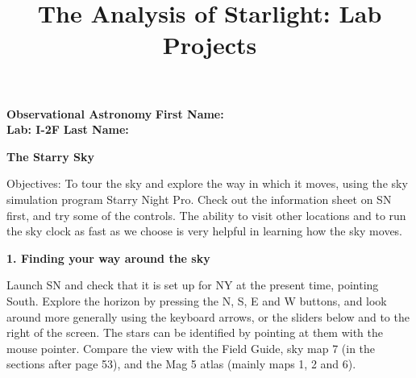 \documentclass[12pt]{article}
\title{The Analysis of Starlight: Lab Projects}
\begin{document}
\setcounter{page}{1}
\setcounter{equation}{0}
\pagestyle{plain}
\thispagestyle{empty}  %
\newcommand{\kms}{\hbox{km\,s$^{\rm -1}$}}
\def\lo {\ifmmode {\,{\it L}\solar} \else $\,L$\solar\fi}       %
\def\my {\ifmmode {\,{\it M}\solar\,{\rm yr^{-1}}}              %
        \else {$\,M$\solar$\,$yr$^{\rm -1}$}\fi}
\def\BD {BD$\,$+30{\degr}3639}
\def\HUNO{\rm H$\,$I}                   %
\def\HDOS{\rm H$_2$}                    %
\def\arcsec{\ifmmode {^{\scriptscriptstyle\prime\prime}}
          \else $^{\scriptscriptstyle\prime\prime}$\fi}
\def\arcminm{\ifmmode {^{\scriptscriptstyle\prime}}
          \else $^{\scriptscriptstyle\prime}$\fi}
\def\deg{\ifmmode^\circ\else$^\circ$\fi}







\noindent
{\bf Observational Astronomy    \hfill} {\bf First Name:\makebox[4cm]{\hrulefill}}\\
{\bf Lab: I-2F} \hfill {\bf Last Name:\makebox[4cm]{\hrulefill}}


\bigskip

\medskip

\noindent
{\hfill \Large {\bf The Starry Sky} \hfill}


\bigskip

\noindent
{Objectives:} To tour the sky and explore the way in which it moves,
using the sky simulation program Starry Night Pro. Check out the
information sheet on SN first, and try some of the controls. The
ability to visit other locations and to run the sky clock as fast as
we choose is very helpful in learning how the sky moves.

\bigskip
\noindent
{\bf 1. Finding your way around the sky}

\medskip
\noindent
Launch SN and check that it is set up for NY at the present time,
pointing South.  Explore the horizon by pressing the N, S, E and W
buttons, and look around more generally using the keyboard arrows, or
the sliders below and to the right of the screen. The stars can be
identified by pointing at them with the mouse pointer. Compare the
view with the Field Guide, sky map 7 (in the sections after page 53),
and the Mag 5 atlas (mainly maps 1, 2  and 6).
\end{document}
